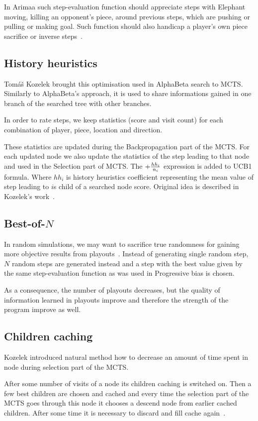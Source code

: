 In Arimaa such step-evaluation function should appreciate steps with Elephant
moving, killing an opponent's piece, around previous steps, which are pushing or
pulling or making goal. Such function should also handicap a player's own piece
sacrifice or inverse steps~\cite{KOZELEK}.

\subsection{History heuristics}
Tomáš Kozelek brought this optimisation used in AlphaBeta search to MCTS.
Similarly to AlphaBeta's approach, it is used to share informations gained in
one branch of the searched tree with other branches.

In order to rate steps, we keep statistics (score and visit count) for each
combination of player, piece, location and direction.

These statistics are updated during the Backpropagation part of the MCTS. For
each updated node we also update the statistics of the step leading to that
node and used in the Selection part of MCTS. The $+ {hh_i \over n_i}$
expression is added to UCB1 formula. Where $hh_i$ is history heuristics
coefficient representing the mean value of step leading to $i$s child of a
searched node score. Original idea is described in Kozelek's
work~\cite{KOZELEK}.

\subsection{Best-of-$N$}
In random simulations, we may want to sacrifice true randomness for gaining
more objective results from playouts~\cite{HeavyPlayouts}. Instead of
generating single random step, $N$ random steps are generated instead and a
step with the best value given by the same step-evaluation function as was used
in Progressive bias is chosen.

As a consequence, the number of playouts decreases, but the quality of
information learned in playouts improve and therefore the strength of the
program improve as well.

\subsection{Children caching}
Kozelek introduced natural method how to decrease an amount of time spent in
node during selection part of the MCTS.

After some number of visits of a node its children caching is switched on. Then
a few best children are chosen and cached and every time the selection part of
the MCTS goes through this node it chooses a descend node from earlier cached
children. After some time it is necessary to discard and fill cache
again~\cite{KOZELEK}.

